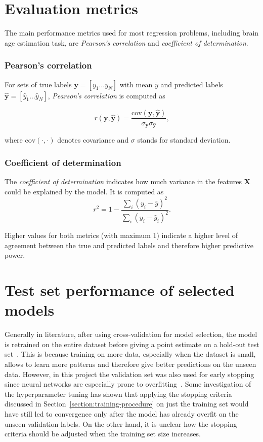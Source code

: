 \section{Evaluation metrics}
\label{section:evaluation-metrics}
The main performance metrics used for most regression problems, including brain age estimation task, are \textit{Pearson's correlation} and \textit{coefficient of determination}.

\subsubsection{Pearson's correlation}
For sets of true labels $\mathbf{y}  = [y_1 \dots y_N]$ with mean $\bar{y}$ and predicted labels $\mathbf{\hat{y}} = [\hat{y}_1 \dots \hat{y}_N]$, \textit{Pearson's correlation} is computed as

\begin{equation}
    r(\mathbf{y}, \mathbf{\hat{y}}) = \frac{\mathrm{cov}(\mathbf{y}, \mathbf{\hat{y}})}{\sigma_{\mathbf{y}} \sigma_{\mathbf{\hat{y}}}},
\end{equation}

where $\mathrm{cov}(\cdot, \cdot)$ denotes covariance and $\sigma$ stands for standard deviation. 

\subsubsection{Coefficient of determination}
The \textit{coefficient of determination} indicates how much variance in the features $\mathbf{X}$ could be explained by the model. It is computed as 
\begin{equation}
    r^2 = 1 - \frac{\sum_{i} (y_i - \bar{y})^2}{\sum_{i} (y_i - \hat{y}_i)^2}.
\end{equation}

Higher values for both metrics (with maximum 1) indicate a higher level of agreement between the true and predicted labels and therefore higher predictive power.


\section{Test set performance of selected models}
Generally in literature, after using cross-validation for model selection, the model is retrained on the entire dataset before giving a point estimate on a hold-out test set~\cite{raschka2018model}. This is because training on more data, especially when the dataset is small, allows to learn more patterns and therefore give better predictions on the unseen data. However, in this project the validation set was also used for early stopping since neural networks are especially prone to overfitting~\cite{prechelt1998automatic}. Some investigation of the hyperparameter tuning has shown that applying the stopping criteria discussed in Section~\ref{section:training-procedure} on just the training set would have still led to convergence only after the model has already overfit on the unseen validation labels. On the other hand, it is unclear how the stopping criteria should be adjusted when the training set size increases. 

